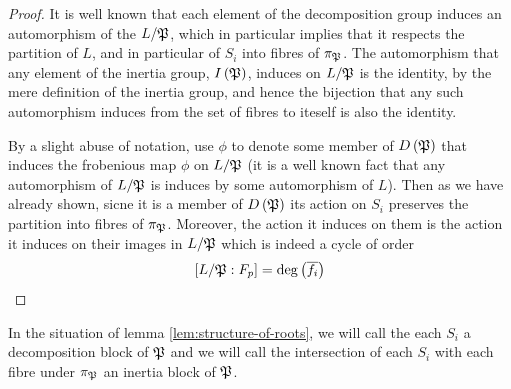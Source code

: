 \documentclass[../main.tex]{subfiles}
\begin{document}
\begin{proof}
  It is well known that each element of the decomposition group induces an automorphism of the $L/\P$, which in particular implies that it respects the partition of $L$, and in particular of $S_i$ into fibres of $\pi_\P$.
  The automorphism that any element of the inertia group, $I\left( \P \right)$, induces on $L/\P$ is the identity, by the mere definition of the inertia group, and hence the bijection that any such automorphism induces from the set of fibres to iteself is also the identity.

  By a slight abuse of notation, use $\phi$ to denote some member of $D\left( \P \right)$ that induces the frobenious map $\phi$ on $L/\P$ (it is a well known fact that any automorphism of $L/\P$ is induces by some automorphism of $L$).
  Then as we have already shown, sicne it is a member of $D\left( \P \right)$ its action on $S_i$ preserves the partition into fibres of $\pi_\P$.
  Moreover, the action it induces on them is the action it induces on their images in $L / \P$ which is indeed a cycle of order 
  \[
    \left[ L/\P : \F_p \right] = \deg\left( \overline{f_i} \right)
  \]
\end{proof}
\begin{definition}
  In the situation of lemma \ref{lem:structure-of-roots}, we will call the each $S_i$ a decomposition block of $\P$ and we will call the intersection of each $S_i$ with each fibre under $\pi_\P$ an inertia block of $\P$.
\end{definition}
\end{document}
